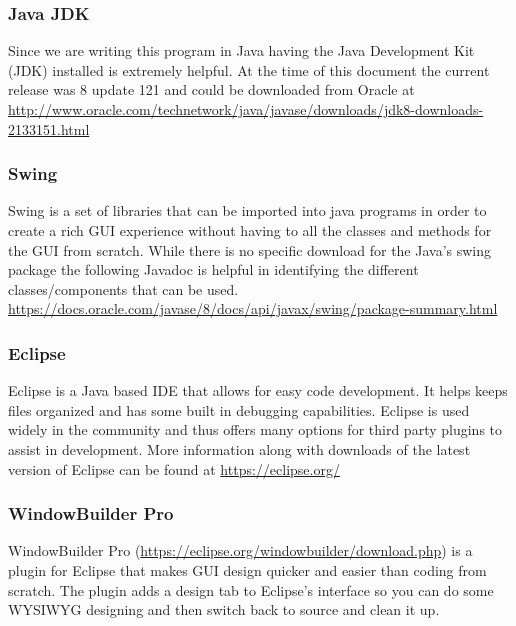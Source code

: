 \documentclass[12pt]{article}
\begin{document}
		\subsubsection{Java JDK}
		Since we are writing this program in Java having the Java Development Kit (JDK) installed is extremely helpful. At the time of this document the current release was 8 update 121 and could be downloaded from Oracle at \url{http://www.oracle.com/technetwork/java/javase/downloads/jdk8-downloads-2133151.html}
		
		\subsubsection{Swing}
		Swing is a set of libraries that can be imported into java programs in order to create a rich GUI experience without having to all the classes and methods for the GUI from scratch. While there is no specific download for the Java's swing package the following Javadoc is helpful in identifying the different classes/components that can be used. \url{https://docs.oracle.com/javase/8/docs/api/javax/swing/package-summary.html}
		
		\subsubsection{Eclipse}
		Eclipse is a Java based IDE that allows for easy code development. It helps keeps files organized and has some built in debugging capabilities. Eclipse is used widely in the community and thus offers many options for third party plugins to assist in development. More information along with downloads of the latest version of Eclipse can be found at \url{https://eclipse.org/}
		
		\subsubsection{WindowBuilder Pro}
		WindowBuilder Pro (\url{https://eclipse.org/windowbuilder/download.php}) is a plugin for Eclipse that makes GUI design quicker and easier than coding from scratch. The plugin adds a design tab to Eclipse's interface so you can do some WYSIWYG designing and then switch back to source and clean it up. 
		
\newpage
\end{document}
